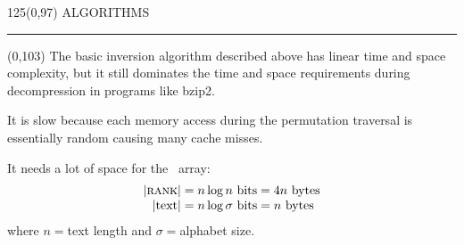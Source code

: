 \begin{textblock}{125}(0,97)
\sffamily\normalsize{\color{sciorange}ALGORITHMS}\small\\
\rule[3mm]{125mm}{0.1pt}
\end{textblock} 


\begin{textblock}{60}(0,103) 
  \footnotesize 
  The basic inversion algorithm described above has linear time and
  space complexity, but it still dominates the time and space
  requirements during decompression in programs like bzip2.
  \vspace{1mm}

  It is slow because each memory access during the permutation 
  traversal is essentially random causing many cache misses.
  \vspace{1mm}

  It needs a lot of space for the \rank\ array:
  \begin{align*}
    |\textsc{rank}| &= n\log n \textrm{ bits} = 4n \textrm{ bytes}\\[-1mm]
    |\textrm{text}| &= n\log\sigma \textrm{ bits} = n \textrm{ bytes}
  \end{align*}
  where $n={}$text length and $\sigma={}$alphabet size.
\end{textblock}

